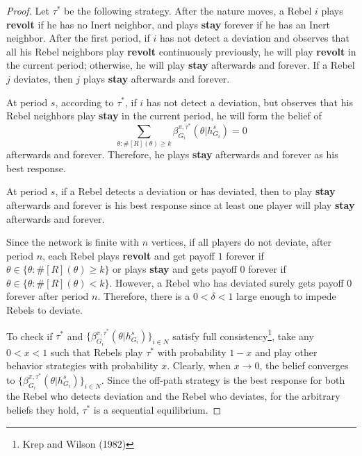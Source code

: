 \documentclass[12pt,letter]{article}
\newtheorem*{lemma*}{Lemma}
\theoremstyle{definition}
\theoremstyle{definition}
\theoremstyle{remark}
\theoremstyle{claim}
\begin{document}
\begin{proof}
Let $\tau^{*}$ be the following strategy. After the nature moves, a Rebel $i$ plays \textbf{revolt} if he has no Inert neighbor, and plays \textbf{stay} forever if he has an Inert neighbor. After the first period, if $i$ has not detect a deviation and observes that all his Rebel neighbors play \textbf{revolt} continuously previously, he will play \textbf{revolt} in the current period; otherwise, he will play \textbf{stay} afterwards and forever. If a Rebel $j$ deviates, then $j$ plays \textbf{stay} afterwards and forever.

At period $s$, according to $\tau^{*}$, if $i$ has not detect a deviation, but observes that his Rebel neighbors play \textbf{stay} in the current period, he will form the belief of \[\sum_{\theta:\#[R](\theta)\geq k}\beta^{\pi,\tau^*}_{G_i}(\theta|h^{s}_{G_i})=0\] afterwards and forever. Therefore, he plays \textbf{stay} afterwards and forever as his best response. 

At period $s$, if a Rebel detects a deviation or has deviated, then to play \textbf{stay} afterwards and forever is his best response since at least one player will play \textbf{stay} afterwards and forever. 

Since the network is finite with $n$ vertices, if all players do not deviate, after period $n$, each Rebel plays \textbf{revolt} and get payoff $1$ forever if $\theta\in \{\theta: \#[R](\theta)\geq k\}$ or plays \textbf{stay} and gets payoff $0$ forever if $\theta\in \{\theta: \#[R](\theta)< k\}$. However, a Rebel who has deviated surely gets payoff $0$ forever after period $n$. Therefore, there is a $0<\delta<1$ large enough to impede Rebels to deviate.

To check if $\tau^{*}$ and $\{\beta^{\pi,\tau^*}_{G_i}(\theta|h^{s}_{G_i})\}_{i\in N}$ satisfy full consistency\footnote{Krep and Wilson (1982)}, take any $0<x<1$ such that Rebels play $\tau^{*}$ with probability $1-x$ and play other behavior strategies with probability $x$. Clearly, when $x \rightarrow 0$, the belief converges to $\{\beta^{\pi,\tau^*}_{G_i}(\theta|h^{s}_{G_i})\}_{i\in N}$. Since the off-path strategy is the best response for both the Rebel who detects deviation and the Rebel who deviates, for the arbitrary beliefs they hold, $\tau^{*}$ is a sequential equilibrium.
\end{proof}
%
%
\end{document}
